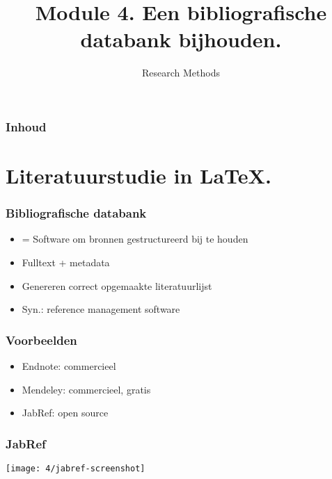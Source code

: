 \documentclass[aspectratio=169]{beamer}
\title{Module 4. Een bibliografische databank bijhouden.}
\subtitle{Research Methods}
\author{\lecturers}   %
\date{\academicyear}
\begin{document}
\begin{frame}
  \maketitle
\end{frame}

\begin{frame}
  \frametitle{Inhoud}

  \tableofcontents
\end{frame}

\section{Literatuurstudie in {\LaTeX}.}

\begin{frame}
  \frametitle{Bibliografische databank}

  \begin{itemize}
    \item = Software om bronnen gestructureerd bij te houden
    \item Fulltext + metadata
    \item Genereren correct opgemaakte literatuurlijst
    \item Syn.: reference management software
  \end{itemize}

\end{frame}

\begin{frame}
  \frametitle{Voorbeelden}

  \begin{itemize}
    \item Endnote: commercieel
    \item Mendeley: commercieel, gratis
    \item JabRef: open source
  \end{itemize}

\end{frame}

\begin{frame}[plain]
  \frametitle{JabRef}

  \centering
  \texttt{[image: 4/jabref-screenshot]}

\end{frame}
\end{document}
